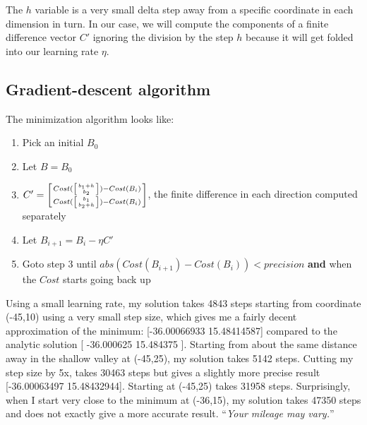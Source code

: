 \documentclass[titlepage]{tufte-book}
\begin{document}
\begin{fullwidth}
\noindent The $h$ variable is a very small delta step away from a specific coordinate in each dimension in turn. In our case, we will compute the components of a finite difference vector $C'$ ignoring the division by the step $h$ because it will get folded into our learning rate $\eta$.

\subsection{Gradient-descent algorithm}

The minimization algorithm looks like:

\begin{enumerate}
\item Pick an initial $B_0$
\item Let $B = B_0$
\item $C' = \left[ Cost(\left[ b_1+h \above 0pt{b_2} \right]) - Cost(B_i) \above 0pt Cost(\left[ b_1 \above 0pt{b_2+h} \right]) - Cost(B_i) \right]$, the finite difference in each direction computed separately
\item Let $B_{i+1} = B_i - \eta C'$
\item Goto step 3 until $abs(Cost(B_{i+1})-Cost(B_i)) < precision$ {\bf and} when the $Cost$ starts going back up
\end{enumerate}

Using a small learning rate, my solution takes 4843 steps starting from coordinate (-45,10) using a very small step size, which gives me a fairly decent approximation of the minimum: [-36.00066933  15.48414587] compared to the analytic solution [ -36.000625 15.484375 ]. Starting from about the same distance away in the shallow valley at (-45,25), my solution takes 5142 steps. Cutting my step size by 5x, takes 30463 steps but gives a slightly more precise result [-36.00063497  15.48432944]. Starting at (-45,25) takes 31958 steps. Surprisingly, when I start very close to the minimum at (-36,15), my solution takes 47350 steps and does not exactly give a more accurate result. ``{\em Your mileage may vary.}''


\end{fullwidth}
\end{document}
